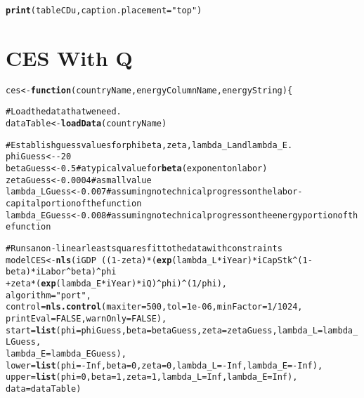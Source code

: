 \documentclass[preprint,authoryear,12pt]{elsarticle}\usepackage{graphicx, color}
\makeatletter
\newcommand{\hlfunctioncall}[1]{\textcolor[rgb]{0.501960784313725,0,0.329411764705882}{\textbf{#1}}}%
\newcommand{\hlstring}[1]{\textcolor[rgb]{0.6,0.6,1}{#1}}%
\newcommand{\hlcomment}[1]{\textcolor[rgb]{0.180392156862745,0.6,0.341176470588235}{#1}}%
\newenvironment{kframe}{%
 \def\at@end@of@kframe{}%
 \ifinner\ifhmode%
  \def\at@end@of@kframe{\end{minipage}}%
  \begin{minipage}{\columnwidth}%
 \fi\fi%
 \def\FrameCommand##1{\hskip\@totalleftmargin \hskip-\fboxsep
 \colorbox{shadecolor}{##1}\hskip-\fboxsep
     \hskip-\linewidth \hskip-\@totalleftmargin \hskip\columnwidth}%
 \MakeFramed {\advance\hsize-\width
   \@totalleftmargin\z@ \linewidth\hsize
   \@setminipage}}%
 {\par\unskip\endMakeFramed%
 \at@end@of@kframe}
\newenvironment{knitrout}{}{} %
\makeatother
\begin{document}
\begin{kframe}
\begin{alltt}
\hlfunctioncall{print}(tableCDu, caption.placement=\hlstring{"top"})
\end{alltt}


{\ttfamily\noindent\bfseries\color{errorcolor}{Error: error in evaluating the argument 'x' in selecting a method for function 'print': Error: object 'tableCDu' not found}}\end{kframe}


\section{CES With Q}

\begin{knitrout}
\color{fgcolor}\begin{kframe}
\begin{alltt}

ces <- \hlfunctioncall{function}(countryName, energyColumnName, energyString)\{
  
\hlcomment{  # Load the data that we need.}
  dataTable <- \hlfunctioncall{loadData}(countryName)
    
\hlcomment{  # Establish guess values for phi beta, zeta, lambda_L and lambda_E.}
  phiGuess <- -20
  betaGuess <- 0.5 \hlcomment{# a typical value for \hlfunctioncall{beta} (exponent on labor)}
  zetaGuess <- 0.0004 \hlcomment{# a small value}
  lambda_LGuess <- 0.007 \hlcomment{#assuming no technical progress on the labor-capital portion of the function}
  lambda_EGuess <- 0.008 \hlcomment{#assuming no technical progress on the energy portion of the function}
  
\hlcomment{  # Runs a non-linear least squares fit to the data with constraints}
  modelCES <- \hlfunctioncall{nls}(iGDP ~ ((1-zeta) * (\hlfunctioncall{exp}(lambda_L*iYear) * iCapStk^(1-beta) * iLabor^beta)^phi 
                           + zeta*(\hlfunctioncall{exp}(lambda_E*iYear) * iQ)^phi)^(1/phi), 
                   algorithm = \hlstring{"port"},
                   control = \hlfunctioncall{nls.control}(maxiter = 500, tol = 1e-06, minFactor = 1/1024, 
                                         printEval = FALSE, warnOnly = FALSE),
                   start = \hlfunctioncall{list}(phi=phiGuess, beta=betaGuess, zeta=zetaGuess, lambda_L=lambda_LGuess, 
                                lambda_E=lambda_EGuess),
                   lower = \hlfunctioncall{list}(phi=-Inf, beta=0, zeta=0, lambda_L=-Inf, lambda_E=-Inf),
                   upper = \hlfunctioncall{list}(phi=0, beta=1, zeta=1, lambda_L=Inf, lambda_E=Inf),
                   data=dataTable)


\end{alltt}
\end{kframe}
\end{knitrout}
\end{document}
